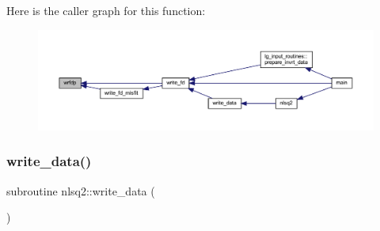 Here is the caller graph for this function\+:\nopagebreak
\begin{figure}[H]
\begin{center}
\leavevmode
\includegraphics[width=350pt]{Leroi_8f90_aa07d276404c70df8a716f8407fa09445_icgraph}
\end{center}
\end{figure}
\mbox{\label{Leroi_8f90_a8213ad17958b78aad4a7bec6b845606b}} 
\subsubsection{\texorpdfstring{write\+\_\+data()}{write\_data()}}
{\footnotesize\ttfamily subroutine nlsq2\+::write\+\_\+data (\begin{DoxyParamCaption}{ }\end{DoxyParamCaption})}

